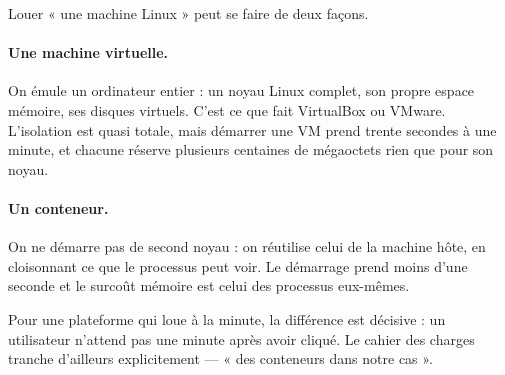Louer « une machine Linux » peut se faire de deux façons.

\paragraph{Une machine virtuelle.} On émule un ordinateur entier : un noyau
Linux complet, son propre espace mémoire, ses disques virtuels. C'est ce que
fait VirtualBox ou VMware. L'isolation est quasi totale, mais démarrer une VM
prend trente secondes à une minute, et chacune réserve plusieurs centaines de
mégaoctets rien que pour son noyau.

\paragraph{Un conteneur.} On ne démarre pas de second noyau : on réutilise
celui de la machine hôte, en cloisonnant ce que le processus peut voir. Le
démarrage prend moins d'une seconde et le surcoût mémoire est celui des
processus eux-mêmes.

Pour une plateforme qui loue à la minute, la différence est décisive : un
utilisateur n'attend pas une minute après avoir cliqué. Le cahier des charges
tranche d'ailleurs explicitement --- « des conteneurs dans notre cas ».

